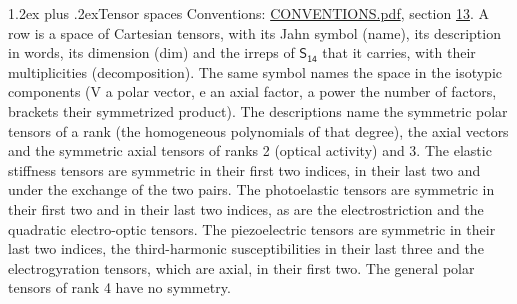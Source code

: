 \documentclass[10pt,a4paper]{article}
\makeatletter
\renewcommand\section{\@startsection{section}{1}{\z@}{-3ex plus -1ex minus -.2ex}%
  {1.2ex plus .2ex}{\normalfont\large\sffamily\bfseries\color{parttitle}}}
\numberwithin{equation}{section}
\newcommand{\grp}[1]{\mathsf{#1}}
\makeatother
\begin{document}
\section{Tensor spaces}\label{s:tensor_spaces}
Conventions: \href{../../CONVENTIONS.pdf}{CONVENTIONS.pdf}, section \href{../../CONVENTIONS.pdf\#conv.13}{13}.
\leavevmode\label{n:head.name}\label{n:head.description}\label{n:head.dim}\label{n:head.decomposition}A row is a space of Cartesian tensors, with its Jahn symbol (name), its description in words, its dimension (dim) and the irreps of $\grp{S_{14}}$ that it carries, with their multiplicities (decomposition). \label{n:label.jahn}The same symbol names the space in the isotypic components (V a polar vector, e an axial factor, a power the number of factors, brackets their symmetrized product). The descriptions name the symmetric polar tensors of a rank (the homogeneous polynomials of that degree), the axial vectors and the symmetric axial tensors of ranks 2 (optical activity) and 3. The elastic stiffness tensors are symmetric in their first two indices, in their last two and under the exchange of the two pairs. The photoelastic tensors are symmetric in their first two and in their last two indices, as are the electrostriction and the quadratic electro-optic tensors. The piezoelectric tensors are symmetric in their last two indices, the third-harmonic susceptibilities in their last three and the electrogyration tensors, which are axial, in their first two. The general polar tensors of rank 4 have no symmetry.
\end{document}
